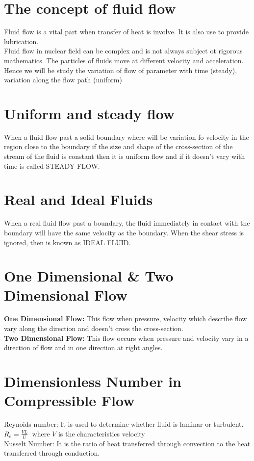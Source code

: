 \documentclass[12pt]{report}
\newcommand{\bt}[1]{\textbf{#1}}
\newcommand{\sps}{\\[0.2cm]}
\newcommand{\NI}{\noindent}
\newcommand{\dsp}{\displaystyle}
\begin{document}
	\section{The concept of fluid flow}
	Fluid flow is a vital part when transfer of heat is involve. It is also use to provide lubrication.\sps
	Fluid flow in nuclear field can be complex and is not always subject ot rigorous mathematics. The particles of fluids move at different velocity and acceleration. Hence we will be study the variation of flow of parameter with time (steady), variation along the flow path (uniform)
	
	\section{Uniform and steady flow}
	When a fluid flow past a solid boundary where will be variation fo velocity in the region close to the boundary if the size and shape of the cross-section of the stream of the fluid is constant then it is uniform flow and if it doesn't vary with time is called STEADY FLOW.
	
	\section{Real and Ideal Fluids}
	When a real fluid flow past a boundary, the fluid immediately in contact with the boundary will have the same velocity as the boundary. When the shear stress is ignored, then is known as IDEAL FLUID.
	
	\section{One Dimensional \& Two Dimensional Flow}
	\bt{One Dimensional Flow:} This flow when pressure, velocity which describe flow vary along the direction and doesn't cross the cross-section.\sps
	\bt{Two Dimensional Flow:} This flow occurs when pressure and velocity vary in a direction of flow and in one direction at right angles.
	
	\section{Dimensionless Number in Compressible Flow}
	Reynoids number: It is used to determine whether fluid is laminar or turbulent. $\dsp R_e = \frac{VL}{U}\;$ where $V$ is the characteristics velocity\sps
	
	\NI Nusselt Number: It is the ratio of heat transferred through convection to the heat transferred through conduction.
	
\end{document}
